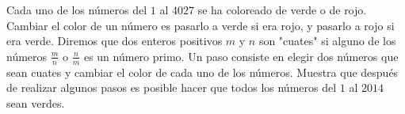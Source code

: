 Cada uno de los números del $1$ al $4027$ se ha coloreado de verde o de rojo. Cambiar el color de un número es pasarlo a verde si era rojo, y pasarlo a rojo si era verde. Diremos que dos enteros positivos $m$ y $n$ son "cuates" si alguno de los números $\frac mn$ o $\frac nm$ es un número primo. Un paso consiste en elegir dos números que sean cuates y cambiar el color de cada uno de los números. Muestra que después de realizar algunos pasos es posible hacer que todos los números del $1$ al $2014$ sean verdes.